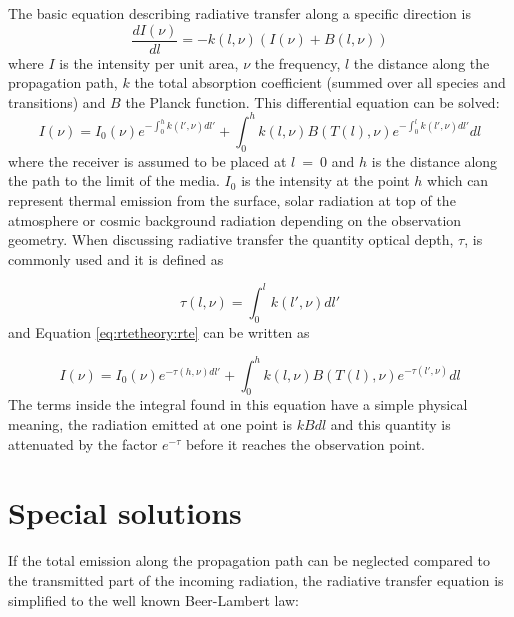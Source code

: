  The basic equation describing radiative transfer along a specific 
 direction is
 \begin{equation}
   \frac{dI(\nu)}{dl} = -k(l,\nu)(I(\nu) + B(l,\nu))
  \label{eq:rtetheory:chand}
 \end{equation} 
 where $I$ is the intensity per unit area, $\nu$ the frequency, $l$
 the distance along the propagation path, $k$ the total absorption
 coefficient (summed over all species and transitions) and $B$ the
 Planck function. This differential equation can be solved:
 \begin{equation}
   I(\nu) = I_0(\nu)e^{-\int^h_0{k(l',\nu)dl'}} + 
     \int^h_0{k(l,\nu)B(T(l),\nu) e^{-\int^l_0{k(l',\nu)dl'}} dl}
  \label{eq:rtetheory:rte}
 \end{equation}  
 where the receiver is assumed to be placed at $l$~=~0 and $h$ is the
 distance along the path to the limit of the media. $I_0$ is the
 intensity at the point $h$ which can represent thermal emission from
 the surface, solar radiation at top of the atmosphere or cosmic
 background radiation depending on the observation geometry. When
 discussing radiative transfer the quantity optical depth, $\tau$, is
 commonly used and it is defined as

 \begin{equation}
   \tau(l,\nu) = \int^l_0{k(l',\nu)dl'} 
  \label{eq:rtetheory:tau}
 \end{equation}  
 and Equation \ref{eq:rtetheory:rte} can be written as
 
 \begin{equation}
   I(\nu) = I_0(\nu)e^{-\tau(h,\nu)dl'} + 
     \int^h_0{k(l,\nu)B(T(l),\nu) e^{-\tau(l',\nu)} dl}
  \label{eq:rtetheory:rte2}
 \end{equation}  
 The terms inside the integral found in this equation have a simple
 physical meaning, the radiation emitted at one point is $kBdl$ and this
 quantity is attenuated by the factor $e^{-\tau}$ before it reaches the
 observation point.




\section{Special solutions}
 \label{sec:rtetheory:special}
 
 If the total emission along the propagation path can be neglected
 compared to the transmitted part of the incoming radiation, the
 radiative transfer equation is simplified to the well known Beer-Lambert law:
 
